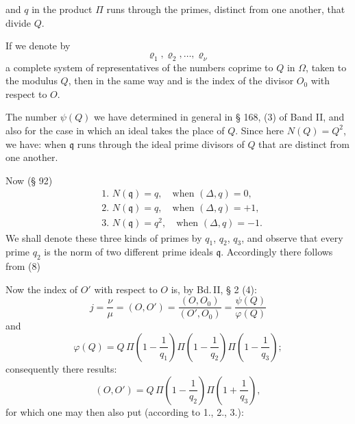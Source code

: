 and $q$ in the product $\Pi$ runs through the primes,
 distinct from one another, that divide $Q$.

If we denote by
\[
\varrho_1, \varrho_2, \ldots, \varrho_\nu
\]
a complete system of representatives of the numbers coprime to $Q$
in $\Omega$, taken to the modulus $Q$, then in the same way
and
is the index of the divisor $O_0$ with respect to $O$.

The number $\psi(Q)$ we have determined in general in § 168, (3) of Band II,
 and also for the case in which an ideal takes
the place of $Q$. Since here $N(Q) = Q^2$, we have:
when $\mathfrak{q}$ runs through the ideal prime divisors of $Q$ that are distinct
from one another.

Now (§ 92)
\[
\begin{aligned}
&\text{1. } N(\mathfrak{q}) = q, \quad \text{when } (\Delta,q) = 0,\\
&\text{2. } N(\mathfrak{q}) = q, \quad \text{when } (\Delta,q) = +1,\\
&\text{3. } N(\mathfrak{q}) = q^2, \quad \text{when } (\Delta,q) = -1.
\end{aligned}
\]
We shall denote these three kinds of primes by $q_1$, $q_2$, $q_3$,
 and observe that every prime $q_2$ is the norm of
two different prime ideals $\mathfrak{q}$. Accordingly there follows from (8)

Now the index of $O'$ with respect to $O$ is, by Bd.\,II, § 2 (4):
\[
j = \frac{\nu}{\mu} = (O, O') = \frac{(O, O_0)}{(O', O_0)} = \frac{\psi(Q)}{\varphi(Q)}
\]
and
\[
\varphi(Q) = Q\, \Pi\left(1 - \frac{1}{q_1}\right) \Pi\left(1 - \frac{1}{q_2}\right) \Pi\left(1 - \frac{1}{q_3}\right);
\]
consequently there results:
\[
(O, O') = Q\, \Pi\left(1 - \frac{1}{q_2}\right) \Pi\left(1 + \frac{1}{q_3}\right),
\]
for which one may then also put (according to 1., 2., 3.):
